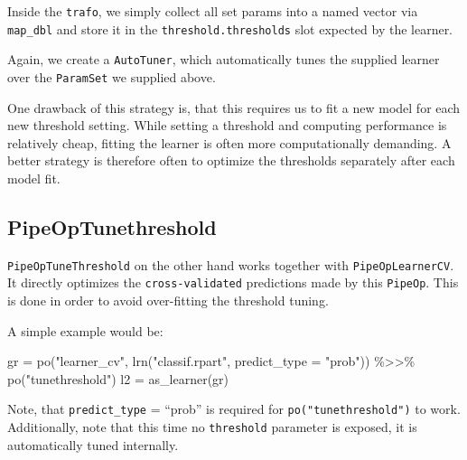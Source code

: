 \documentclass[
]{scrbook}
\newenvironment{Shaded}{\begin{snugshade}}{\end{snugshade}}
\newcommand{\AttributeTok}[1]{\textcolor[rgb]{0.77,0.63,0.00}{#1}}
\newcommand{\FunctionTok}[1]{\textcolor[rgb]{0.00,0.00,0.00}{#1}}
\newcommand{\NormalTok}[1]{#1}
\newcommand{\OtherTok}[1]{\textcolor[rgb]{0.56,0.35,0.01}{#1}}
\newcommand{\SpecialCharTok}[1]{\textcolor[rgb]{0.00,0.00,0.00}{#1}}
\newcommand{\StringTok}[1]{\textcolor[rgb]{0.31,0.60,0.02}{#1}}
\renewenvironment{Shaded} {\begin{snugshade}\small} {\end{snugshade}}
\begin{document}
Inside the \texttt{trafo}, we simply collect all set params into a named vector via \texttt{map\_dbl} and store it
in the \texttt{threshold.thresholds} slot expected by the learner.

Again, we create a \texttt{AutoTuner}, which automatically tunes the supplied learner over the \texttt{ParamSet} we supplied above.

One drawback of this strategy is, that this requires us to fit a new model for each new threshold setting.
While setting a threshold and computing performance is relatively cheap, fitting the learner is often
more computationally demanding.
A better strategy is therefore often to optimize the thresholds separately after each model fit.

\hypertarget{pipeoptunethreshold}{%
\subsection{PipeOpTunethreshold}\label{pipeoptunethreshold}}

\texttt{PipeOpTuneThreshold} on the other hand works together with \texttt{PipeOpLearnerCV}.
It directly optimizes the \texttt{cross-validated} predictions made by this \texttt{PipeOp}.
This is done in order to avoid over-fitting the threshold tuning.

A simple example would be:

\begin{Shaded}
\begin{Highlighting}[]
\NormalTok{gr }\OtherTok{=} \FunctionTok{po}\NormalTok{(}\StringTok{"learner\_cv"}\NormalTok{, }\FunctionTok{lrn}\NormalTok{(}\StringTok{"classif.rpart"}\NormalTok{, }\AttributeTok{predict\_type =} \StringTok{"prob"}\NormalTok{)) }\SpecialCharTok{\%\textgreater{}\textgreater{}\%} \FunctionTok{po}\NormalTok{(}\StringTok{"tunethreshold"}\NormalTok{)}
\NormalTok{l2 }\OtherTok{=} \FunctionTok{as\_learner}\NormalTok{(gr)}
\end{Highlighting}
\end{Shaded}

Note, that \texttt{predict\_type} = ``prob'' is required for \texttt{po("tunethreshold")} to work.
Additionally, note that this time no \texttt{threshold} parameter is exposed, it is automatically tuned internally.

\begin{Shaded}
\end{Shaded}
\end{document}
